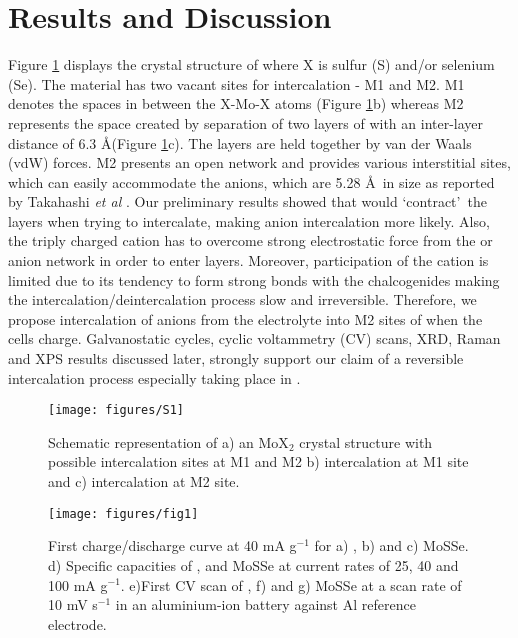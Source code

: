 \section{Results and Discussion}
Figure \ref{figures:S1} displays the crystal structure of  where X is sulfur (S) and/or selenium (Se). The material has two vacant sites for intercalation - M1 and M2. M1 denotes the spaces in between the X-Mo-X atoms (Figure \ref{figures:S1}b) whereas M2 represents the space created by separation of two layers of  with an inter-layer distance of 6.3 \AA (Figure \ref{figures:S1}c). The layers are held together by van der Waals (vdW) forces. M2 presents an open network and provides various interstitial sites, which can easily accommodate the  anions, which are 5.28 \AA\ in size as reported by Takahashi {\it et al} \cite{takahashi_niv2o5nh2o_2005}. Our preliminary results showed that  would \lq contract\rq\ the  layers when trying to intercalate, making  anion intercalation more likely. Also, the triply charged  cation has to overcome strong electrostatic force from the  or  anion network in order to enter  layers. Moreover, participation of the cation is limited due to its tendency to form strong bonds with the chalcogenides making the intercalation/deintercalation process slow and irreversible. Therefore, we propose intercalation of  anions from the electrolyte into M2 sites of  when the cells charge. Galvanostatic cycles, cyclic voltammetry (CV) scans, XRD, Raman and XPS results discussed later, strongly support our claim of a reversible intercalation process especially taking place in  . 
\begin{figure}[htb!]
\centering
\texttt{[image: figures/S1]}
\caption{Schematic representation of a) an MoX$_2$ crystal structure with possible intercalation sites at M1 and M2 b) intercalation at M1 site and c) intercalation at M2 site.}
 \label{figures:S1}
\end{figure}
 \begin{figure}[htb!]
\centering
\texttt{[image: figures/fig1]}
\caption{First charge/discharge curve at 40 mA g$^{-1}$ for a) , b)  and c) MoSSe. d) Specific capacities of ,  and MoSSe at current rates of 25, 40 and 100 mA g$^{-1}$. e)First CV scan of , f)  and g) MoSSe at a scan rate of 10 mV s$^{-1}$ in an aluminium-ion battery against Al reference electrode.}
\label{figures:fig1}
\end{figure} 
